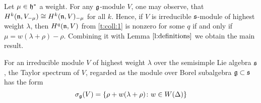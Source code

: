 Let $\mu \in \mathfrak{h}^*$ a weight. For any $\mathfrak{g}$-module $V$, one may observe, that $H^k(\mathfrak{n},
V_{-\mu}) \cong H^k(\mathfrak{n}, V)_{-\mu}$ for all $k$. Hence, if $V$ is irreducible $\mathfrak{s}$-module of
highest weight $\lambda$, then $H^q(\mathfrak{n}, V)$ from \ref{t:coll:1} is nonzero for some $q$ if and only if $\mu =
w(\lambda + \rho) - \rho$. Combining it with Lemma $\ref{l:definitions}$ we obtain the main result.
\begin{theorem}
   For an irreducible module $V$ of highest weight $\lambda$ over the semisimple Lie algebra
   $\mathfrak{s}$, the Taylor spectrum of $V$, regarded as the module over Borel subalgebra $\mathfrak{g} \subset
   \mathfrak{s}$ has the form 
   \[
       \sigma_{\mathfrak{g}}(V) = \{ \rho + w(\lambda + \rho)\colon w \in W(\Delta)\}
   \]
\end{theorem}
